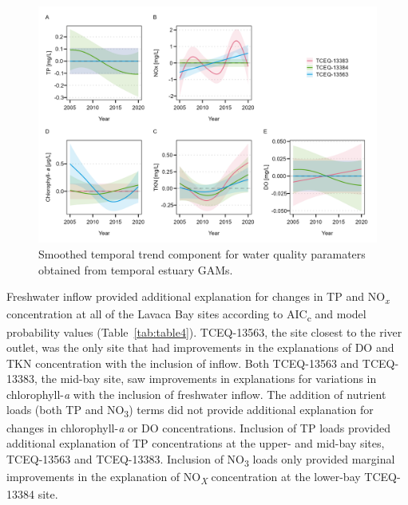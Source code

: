 \documentclass[sn-basic,referee,lineno,pdflatex]{sn-jnl}
\begin{document}
\begin{figure}

{\centering \includegraphics[width=1\linewidth,]{Schramm-2023-05-AS_files/figure-latex/fig5-1} 

}

\caption{Smoothed temporal trend component for water quality paramaters obtained from temporal estuary GAMs.}\label{fig:fig5}
\end{figure}

Freshwater inflow provided additional explanation for changes in TP and
NO\textsubscript{\emph{x}} concentration at all of the Lavaca Bay sites
according to AIC\textsubscript{c} and model probability values
(Table~\ref{tab:table4}). TCEQ-13563, the site closest to the river
outlet, was the only site that had improvements in the explanations of
DO and TKN concentration with the inclusion of inflow. Both TCEQ-13563
and TCEQ-13383, the mid-bay site, saw improvements in explanations for
variations in chlorophyll-\emph{a} with the inclusion of freshwater
inflow. The addition of nutrient loads (both TP and NO\textsubscript{3})
terms did not provide additional explanation for changes in
chlorophyll-\emph{a} or DO concentrations. Inclusion of TP loads
provided additional explanation of TP concentrations at the upper- and
mid-bay sites, TCEQ-13563 and TCEQ-13383. Inclusion of
NO\textsubscript{3} loads only provided marginal improvements in the
explanation of NO\textsubscript{\emph{X}} concentration at the lower-bay
TCEQ-13384 site.
\end{document}

